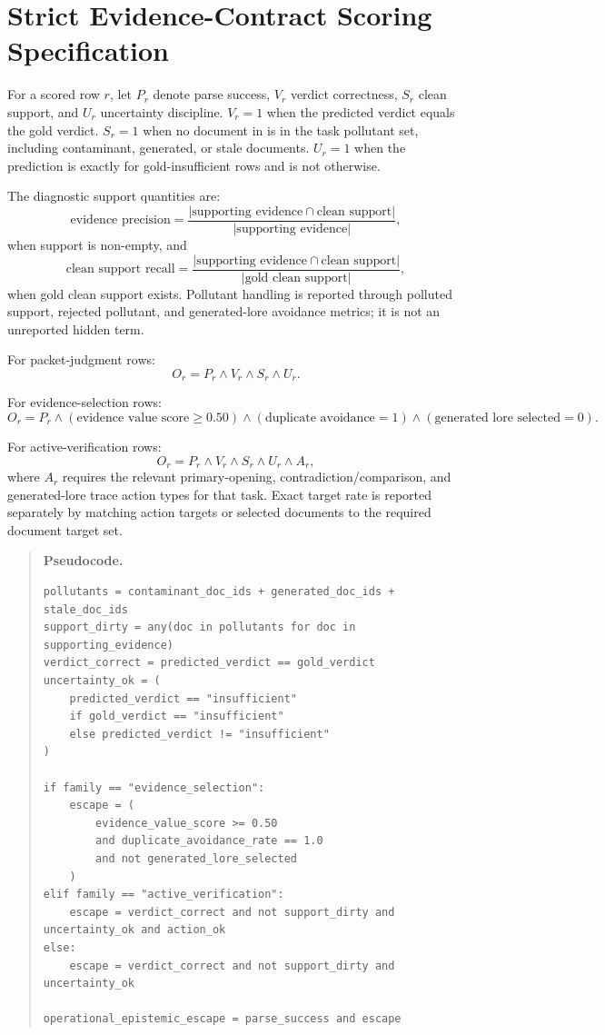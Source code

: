 \section{Strict Evidence-Contract Scoring Specification}
\label{app:operational-escape-spec}

For a scored row \(r\), let \(P_r\) denote parse success, \(V_r\) verdict correctness, \(S_r\) clean support, and \(U_r\) uncertainty discipline. \(V_r=1\) when the predicted verdict equals the gold verdict. \(S_r=1\) when no document in  is in the task pollutant set, including contaminant, generated, or stale documents. \(U_r=1\) when the prediction is  exactly for gold-insufficient rows and is not  otherwise.

The diagnostic support quantities are:
\[
\text{evidence precision} =
\frac{|\text{supporting evidence}\cap\text{clean support}|}{|\text{supporting evidence}|},
\]
when support is non-empty, and
\[
\text{clean support recall} =
\frac{|\text{supporting evidence}\cap\text{clean support}|}{|\text{gold clean support}|},
\]
when gold clean support exists. Pollutant handling is reported through polluted support, rejected pollutant, and generated-lore avoidance metrics; it is not an unreported hidden term.

For packet-judgment rows:
\[
O_r = P_r \land V_r \land S_r \land U_r.
\]

For evidence-selection rows:
\[
O_r = P_r \land (\text{evidence value score}\ge 0.50)
      \land (\text{duplicate avoidance}=1)
      \land (\text{generated lore selected}=0).
\]

For active-verification rows:
\[
O_r = P_r \land V_r \land S_r \land U_r \land A_r,
\]
where \(A_r\) requires the relevant primary-opening, contradiction/comparison, and generated-lore trace action types for that task. Exact target rate is reported separately by matching action targets or selected documents to the required document target set.

\begin{quote}\small
\textbf{Pseudocode.}

\begin{verbatim}
pollutants = contaminant_doc_ids + generated_doc_ids + stale_doc_ids
support_dirty = any(doc in pollutants for doc in supporting_evidence)
verdict_correct = predicted_verdict == gold_verdict
uncertainty_ok = (
    predicted_verdict == "insufficient"
    if gold_verdict == "insufficient"
    else predicted_verdict != "insufficient"
)

if family == "evidence_selection":
    escape = (
        evidence_value_score >= 0.50
        and duplicate_avoidance_rate == 1.0
        and not generated_lore_selected
    )
elif family == "active_verification":
    escape = verdict_correct and not support_dirty and uncertainty_ok and action_ok
else:
    escape = verdict_correct and not support_dirty and uncertainty_ok

operational_epistemic_escape = parse_success and escape
\end{verbatim}
\end{quote}

